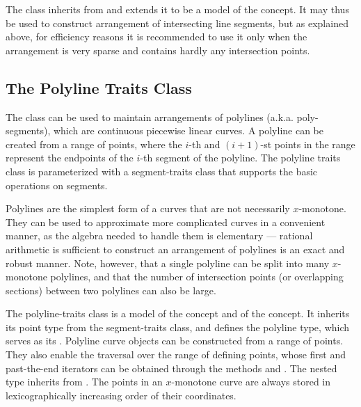 The class  inherits
from  and
extends it to be a model of the  concept.
It may thus be used to construct arrangement of intersecting line
segments, but as explained above, for efficiency reasons it is
recommended to use it only when the arrangement is very sparse and
contains hardly any intersection points.

\subsection{The Polyline Traits Class}
\label{arr_ssec:tr_polylines}
%
The  class can be used
to maintain arrangements of polylines (a.k.a. poly-segments),
which are continuous piecewise linear curves. A polyline can be
created from a range of points, where the $i$-th and $(i+1)$-st
points in the range represent the endpoints of the $i$-th segment
of the polyline. The polyline traits class is parameterized with a
segment-traits class that supports the basic operations on
segments.

Polylines are the simplest form of a curves that are not
necessarily $x$-monotone. They can be used to approximate more
complicated curves in a convenient manner, as the algebra needed
to handle them is elementary --- rational arithmetic is sufficient
to construct an arrangement of polylines is an exact and robust
manner. Note, however, that a single polyline can be split into
many $x$-monotone polylines, and that the number of intersection
points (or overlapping sections) between two polylines can also
be large. 

The polyline-traits class is a model of the 
concept and of the  concept.
It inherits its point type from the segment-traits class, and defines
the polyline type, which serves as its . Polyline curve
objects can be constructed from a range of points. They also enable
the traversal over the range of defining points, whose first and
past-the-end iterators can be obtained through the methods 
and . The nested  type inherits
from . The points in an $x$-monotone curve are
always stored in lexicographically increasing order of their
coordinates.

